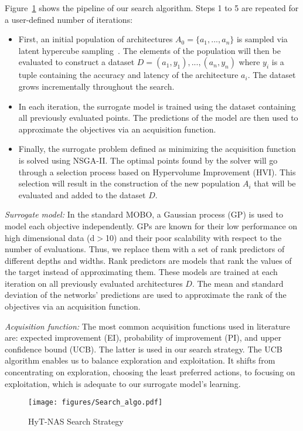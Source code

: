 \documentclass[conference]{IEEEtran}
\begin{document}
Figure~\ref{fig:search_algo} shows the pipeline of our search algorithm. Steps 1 to 5 are repeated for a user-defined number of iterations:
\begin{itemize}
    \item First, an initial population of architectures $A_{0}=\{ a_1,...,a_n \} $ is sampled via latent hypercube sampling~\cite{DBLP:journals/technometrics/McKayBC00}. The elements of the population  will then be evaluated to construct a dataset $D={(a_1,y_1),...,(a_n,y_n)}$ where  $y_i$ is a tuple containing the accuracy and latency of the architecture $a_i$. The dataset  grows incrementally throughout the search.
    \item In each iteration, the surrogate model is trained using the dataset containing all previously evaluated points. The predictions of the model are then used to approximate the objectives via an acquisition function.
    \item Finally, the surrogate problem defined as minimizing the acquisition function is solved using NSGA-II. The optimal points found by the solver will go through a selection process based on Hypervolume Improvement (HVI). This selection will result in the construction of the new population $A_i$ that will be evaluated and added to the dataset $D$.
\end{itemize}

\textit{Surrogate model:} In the standard MOBO, a Gaussian process (GP) is used to model each objective independently. GPs are known for their low performance on high dimensional data (d$>$10) and their poor scalability with respect to the number of evaluations. Thus, we replace them with a set of rank predictors of different depths and widths. 
Rank predictors are models that rank the values of the target instead of approximating them. These models are trained at each iteration on all previously evaluated architectures $D$. The mean and standard deviation of the networks' predictions are used to approximate the rank of the objectives via an acquisition function.

\textit{Acquisition function:} The most common acquisition functions used in literature are: expected improvement (EI), probability of improvement (PI), and upper confidence bound (UCB). The latter is used in our search strategy. The UCB algorithm enables us to balance exploration and exploitation. It shifts from concentrating on exploration, choosing the least preferred actions, to focusing on exploitation, which is adequate to our surrogate model's learning.
\begin{figure}[t]
    \centering
    \texttt{[image: figures/Search\_algo.pdf]}
    \caption{HyT-NAS Search Strategy }
    \label{fig:search_algo}
    \vspace{-0.5cm}
\end{figure}
\end{document}
